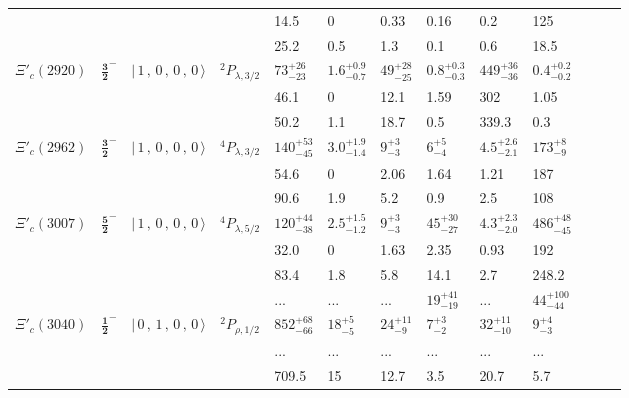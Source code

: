 \documentclass[11pt]{article}
\begin{document}
\begin{table}[htbp]
{\begin{tabular}{c c c c  p{1.0cm}  p{1.0cm}  p{1.0cm}  p{1.0cm}  p{1.0cm}  p{1.0cm}  p{1.0cm}  p{1.0cm}  p{1.0cm}}
 & &  &   & 14.5 & 0 & 0.33 & 0.16 & 0.2 & 125 &  \\
 & &  &   & 25.2 & 0.5 & 1.3 & 0.1 & 0.6 & 18.5 &  \\
$\Xi'_c(2920)$  & $ \mathbf{\frac{3}{2}^-}$ & $\vert \,1\,,\,0\,,\,0\,,\,0 \,\rangle $ &$^{2}P_{\lambda,3/2}$&$ 73 _{- 23 }^{+ 26 }$    &  $ 1.6 _{- 0.7 }^{+ 0.9 }$    &  $ 49 _{- 25 }^{+ 28 }$    &  $ 0.8 _{- 0.3 }^{+ 0.3 }$    &  $ 449 _{- 36 }^{+ 36 }$    &  $ 0.4 _{- 0.2 }^{+ 0.2 }$   \\
 & &  &   & 46.1 & 0 & 12.1 & 1.59 & 302 & 1.05 &  \\
 & &  &   & 50.2 & 1.1 & 18.7 & 0.5 & 339.3 & 0.3 &  \\
$\Xi'_c(2962)$  & $ \mathbf{\frac{3}{2}^-}$ & $\vert \,1\,,\,0\,,\,0\,,\,0 \,\rangle $ &$^{4}P_{\lambda,3/2}$&$ 140 _{- 45 }^{+ 53 }$    &  $ 3.0 _{- 1.4 }^{+ 1.9 }$    &  $ 9 _{- 3 }^{+ 3 }$    &  $ 6 _{- 4 }^{+ 5 }$    &  $ 4.5 _{- 2.1 }^{+ 2.6 }$    &  $ 173 _{- 9 }^{+ 8 }$   \\
 & &  &   & 54.6 & 0 & 2.06 & 1.64 & 1.21 & 187 &  \\
 & &  &   & 90.6 & 1.9 & 5.2 & 0.9 & 2.5 & 108 &  \\
$\Xi'_c(3007)$  & $ \mathbf{\frac{5}{2}^-}$ & $\vert \,1\,,\,0\,,\,0\,,\,0 \,\rangle $ &$^{4}P_{\lambda,5/2}$&$ 120 _{- 38 }^{+ 44 }$    &  $ 2.5 _{- 1.2 }^{+ 1.5 }$    &  $ 9 _{- 3 }^{+ 3 }$    &  $ 45 _{- 27 }^{+ 30 }$    &  $ 4.3 _{- 2.0 }^{+ 2.3 }$    &  $ 486 _{- 45 }^{+ 48 }$   \\
 & &  &   & 32.0 & 0 & 1.63 & 2.35 & 0.93 & 192 &  \\
 & &  &   & 83.4 & 1.8 & 5.8 & 14.1 & 2.7 & 248.2 &  \\
  & &  &   & ... & ... & ... & $19^{+41}_{-19}$ & ... & $44^{+100}_{-44}$  &  \\
$\Xi'_c(3040)$  & $ \mathbf{\frac{1}{2}^-}$ & $\vert \,0\,,\,1\,,\,0\,,\,0 \,\rangle $ &$^{2}P_{\rho,1/2}$&$ 852 _{- 66 }^{+ 68 }$    &  $ 18 _{- 5 }^{+ 5 }$    &  $ 24 _{- 9 }^{+ 11 }$    &  $ 7 _{- 2 }^{+ 3 }$    &  $ 32 _{- 10 }^{+ 11 }$    &  $ 9 _{- 3 }^{+ 4 }$   \\
  & &  &   & ... & ... & ... & ... & ... & ... &  \\
 & &  &   & 709.5 & 15 & 12.7 & 3.5 & 20.7 & 5.7 &  \\

\end{tabular}}
\end{table}
\end{document}
